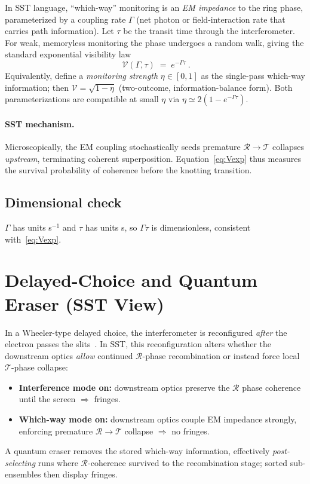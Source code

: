 \documentclass[11pt,a4paper]{article}
\begin{document}
    In SST language, ``which-way'' monitoring is an \emph{EM impedance} to the ring phase, parameterized by a coupling rate $\Gamma$ (net photon or field-interaction rate that carries path information).
    Let $\tau$ be the transit time through the interferometer.
    For weak, memoryless monitoring the phase undergoes a random walk, giving the standard exponential visibility law~\cite{Zurek2003}
    \begin{equation}
    \boxed{\ \mathcal V(\Gamma,\tau) \;=\; e^{-\Gamma \tau}\ }. \label{eq:Vexp}
    \end{equation}
    Equivalently, define a \emph{monitoring strength} $\eta\in[0,1]$ as the single-pass which-way information; then $\mathcal V=\sqrt{1-\eta}$ (two-outcome, information-balance form). Both parameterizations are compatible at small $\eta$ via $\eta\simeq 2(1-e^{-\Gamma\tau})$.

    \paragraph{SST mechanism.}
        Microscopically, the EM coupling stochastically seeds premature $\mathcal R\!\to\!\mathcal T$ collapses \emph{upstream}, terminating coherent superposition.
        Equation~\eqref{eq:Vexp} thus measures the survival probability of coherence before the knotting transition.

\subsection{Dimensional check}
$\Gamma$ has units s$^{-1}$ and $\tau$ has units s, so $\Gamma\tau$ is dimensionless, consistent with~\eqref{eq:Vexp}.

\section{Delayed-Choice and Quantum Eraser (SST View)}

In a Wheeler-type delayed choice, the interferometer is reconfigured \emph{after} the electron passes the slits~\cite{Wheeler1978}.
In SST, this reconfiguration alters whether the downstream optics \emph{allow} continued $\mathcal R$-phase recombination or instead force local $\mathcal T$-phase collapse:
\begin{itemize}
\item \textbf{Interference mode on:} downstream optics preserve the $\mathcal R$ phase coherence until the screen $\Rightarrow$ fringes.
\item \textbf{Which-way mode on:} downstream optics couple EM impedance strongly, enforcing premature $\mathcal R\!\to\!\mathcal T$ collapse $\Rightarrow$ no fringes.
\end{itemize}
A quantum eraser removes the stored which-way information, effectively \emph{post-selecting} runs where $\mathcal R$-coherence survived to the recombination stage; sorted sub-ensembles then display fringes.
\end{document}
